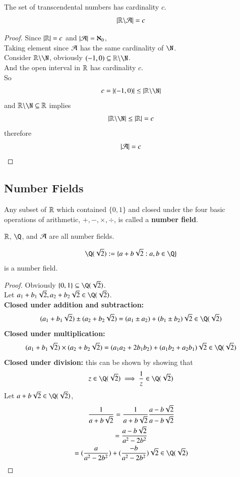 \documentclass[10pt]{article}
\begin{document}
		\begin{theorem}
			The set of transcendental numbers has cardinality $c$.
			\[
				|\mathbb{R} \backslash \mathcal{{A}}| = c
			\]
		\end{theorem}
		\begin{proof}
			Since $|\mathbb{R}| = c$ and $|\mathcal{{A}}| = \aleph_0$, \\
			Taking element since $\mathcal{{A}}$ has the same cardinality of $\N$. \\
			Consider $\R \backslash \N$, obviously $(-1,0) \subseteq \R \backslash \N$. \\
			And the open interval in $\mathbb{R}$ has cardinality $c$. \\
			So 
			\[
				c = |(-1,0)| \leq |\R \backslash \N|
			\]
			and $\R \backslash \N \subseteq \R$ implies 
			\[
				|\R \backslash \N| \leq |\R| = c
			\]
			therefore 
			\[
				|\mathcal{{A}}| = c
			\]
		\end{proof}
		
		\subsection{Number Fields}
		\begin{definition}
			Any subset of $\mathbb{R}$ which contained $\{0,1\}$ and closed under the four basic operations of arithmetic, $+, -, \times, \div$, is called a \textbf{number field}.
		\end{definition}
		
		\begin{example}
			$\mathbb{R}$, $\Q$, and $\mathcal{{A}}$ are all number fields.
		\end{example}
		
		\begin{example}
			\[
				\Q(\sqrt{2}) := \{a+b\sqrt{2}:a,b\in\Q\}
			\]
			is a number field.
		\end{example}
		\begin{proof}
			Obviously $\{0, 1\} \subseteq \Q(\sqrt{2})$. \\
			Let $a_1 + b_1 \sqrt{2}, a_2 + b_2 \sqrt{2} \in \Q(\sqrt{2})$. \\
			\textbf{Closed under addition and subtraction: }
			\[
				(a_1 + b_1 \sqrt{2}) \pm (a_2 + b_2 \sqrt{2}) = (a_1 \pm a_2) + (b_1 \pm b_2)\sqrt{2} \in \Q(\sqrt{2})
			\]
			\textbf{Closed under multiplication: }
			\[
				(a_1 + b_1 \sqrt{2}) \times (a_2 + b_2 \sqrt{2}) = (a_1 a_2 + 2 b_1 b_2) + (a_1 b_2 + a_2 b_1)\sqrt{2} \in \Q(\sqrt{2})
			\]
			\textbf{Closed under division: } this can be shown by showing that 
			\[
				z \in \Q(\sqrt{2}) \implies \frac{1}{z} \in \Q(\sqrt{2})
			\]
			Let $a + b \sqrt{2} \in \Q(\sqrt{2})$,
			\begin{gather*}
				\frac{1}{a+b\sqrt{2}} = \frac{1}{a+b\sqrt{2}} \frac{a-b\sqrt{2}}{a-b\sqrt{2}} \\
				= \frac{a-b\sqrt{2}}{a^2 - 2b^2} \\
				= (\frac{a}{a^2 - 2b^2}) + (\frac{-b}{a^2 - 2b^2})\sqrt{2} \in \Q(\sqrt{2})
			\end{gather*}
		\end{proof}
\end{document}
